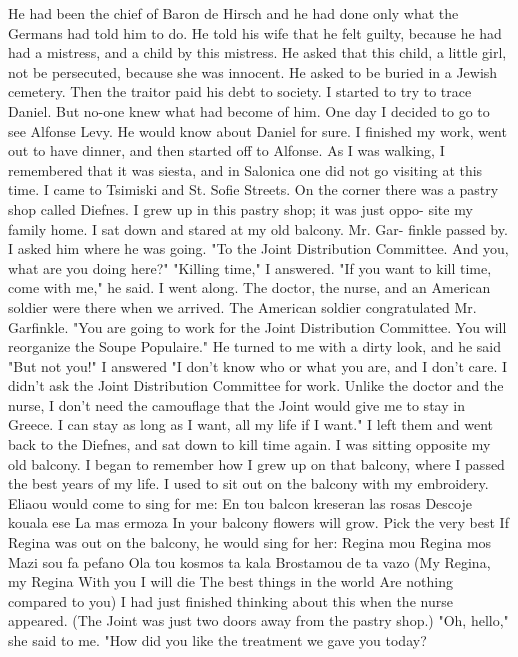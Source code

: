 He had been the chief of Baron de Hirsch and 
he had done only what the Germans had told him to do.
He told his wife 
that he felt guilty, because he had had a mistress, and a child by this 
mistress.
He asked that this child, a little girl, not be persecuted, 
because she was innocent.
He asked to be buried in a Jewish cemetery.
Then the traitor paid his debt to society.
I started to try to trace Daniel.
But no-one knew what had become 
of him.
One day I decided to go to see Alfonse Levy.
He would know 
about Daniel for sure.
I finished my work, went out to have dinner, 
and then started off to Alfonse.
As I was walking, I remembered that 
it was siesta, and in Salonica one did not go visiting at this time.
I 
came to Tsimiski and St.
Sofie Streets.
On the corner there was a pastry 
shop called Diefnes.
I grew up in this pastry shop; it was just oppo-
site my family home.
I sat down and stared at my old balcony.
Mr.
Gar-
finkle passed by.
I asked him where he was going.
"To the Joint Distribution Committee.
And you, what are you doing 
here?"
"Killing time," I answered.
"If you want to kill time, come with me," he said.
I went along.
The doctor, the nurse, and an American soldier were there when we 
arrived.
The American soldier congratulated Mr.
Garfinkle.
"You are 
going to work for the Joint Distribution Committee.
You will reorganize 
the Soupe Populaire."
He turned to me with a dirty look, and he said 
"But not you!"
I answered "I don't know who or what you are, and I don't care.
I 
didn't ask the Joint Distribution Committee for work.
Unlike the doctor 
and the nurse, I don't need the camouflage that the Joint would give me 
to stay in Greece.
I can stay as long as I want, all my life if I want."
I left them and went back to the Diefnes, and sat down to kill time again.
I was sitting opposite my old balcony.
I began to remember how I 
grew up on that balcony, where I passed the best years of my life.
I 
used to sit out on the balcony with my embroidery.
Eliaou would come 
to sing for me: 
En tou balcon kreseran las rosas 
Descoje kouala ese 
La mas ermoza 
In your balcony flowers will grow.
Pick the very best
If Regina was out on the balcony, he would sing for her: 
Regina mou Regina mos 
Mazi sou fa pefano 
Ola tou kosmos ta kala 
Brostamou de ta vazo 
(My Regina, my Regina 
With you I will die 
The best things in the world 
Are nothing compared to you) 
I had just finished thinking about this when the nurse appeared.
(The Joint was just two doors away from the pastry shop.)
"Oh, hello," she said to me.
"How did you like the treatment we 
gave you today?
